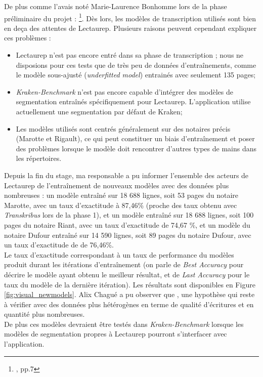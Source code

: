De plus comme l'avais noté Marie-Laurence Bonhomme lors de la phase préliminaire du projet : \footnote{\cite{bonhomme_defis_2018}, pp.7}. Dès lors, les modèles de transcription utilisés sont bien en deça des attentes de Lectaurep. Plusieurs raisons peuvent cependant expliquer ces problèmes :

\begin{itemize}
    \item Lectaurep n'est pas encore entré dans sa phase de transcription ; nous ne disposions pour ces tests que de très peu de données d'entraînements, comme le modèle sous-ajusté (\textit{underfitted model})  entrainés avec seulement 135 pages;
    \item \textit{Kraken-Benchmark} n'est pas encore capable d'intégrer des modèles de segmentation entraînés spécifiquement pour Lectaurep. L'application utilise actuellement une segmentation par défaut de Kraken;
    \item Les modèles utilisés sont centrés généralement sur des notaires précis (Marotte et Rigault), ce qui peut constituer un biais d'entraînement et poser des problèmes lorsque le modèle doit rencontrer d'autres types de mains dans les répertoires.
\end{itemize}

Depuis la fin du stage, ma responsable a pu informer l'ensemble des acteurs de Lectaurep de l'entraînement de nouveaux modèles avec des données plus nombreuses : un modèle entraîné sur 18 688 lignes, soit 53 pages du notaire Marotte, avec un taux d'exactitude à 87,46\% (proche des taux obtenu avec \textit{Transkribus} lors de la phase 1), et un modèle entraîné sur 18 688 lignes, soit 100 pages du notaire Riant, avec un taux d'exactitude de 74,67 \%, et un modèle du notaire Dufour entraîné sur 14 590 lignes, soit 89 pages du notaire Dufour, avec un taux d'exactitude de de 76,46\%. \\ 

Le taux d'exactitude correspondant à un taux de performance du modèles produit durant les itérations d'entraînement (on parle de \textit{Best Accuracy} pour décrire le modèle ayant obtenu le meilleur résultat, et de \textit{Last Accuracy} pour le taux du modèle de la dernière itération). Les résultats sont disponibles en Figure \ref{fig:visual_newmodels}. Alix Chagué a pu observer que , une hypothèse qui reste à vérifier avec des données plus hétérogènes en terme de qualité d'écritures et en quantité plus nombreuses. \\ De plus ces modèles devraient être testés dans \textit{Kraken-Benchmark} lorsque les modèles de segmentation propres à Lectaurep pourront s'interfacer avec l'application.\\

